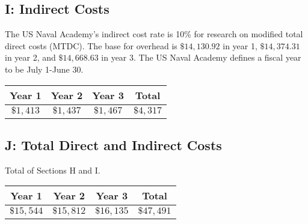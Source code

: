 \documentclass[11pt]{article}
\begin{document}
\subsection*{I: Indirect Costs}
The US Naval Academy's indirect cost rate is
10\% for research on modified total direct costs (MTDC).
The base for overhead is $\$14,130.92$ in year 1, $\$14,374.31$ in
year 2, and $\$14,668.63$ in year 3.
The US Naval Academy defines a fiscal year to be July 1-June 30.
\begin{center}
  \begin{tabular}{|c|c|c|c|}
    \hline
    Year 1 & Year 2 & Year 3 & Total \\
    \hline
    $\$1,413$ & $\$1,437$ & $\$1,467$ & $\$4,317$ \\
    \hline
  \end{tabular}
\end{center}


\subsection*{J: Total Direct and Indirect Costs}
Total of Sections H and I.
\begin{center}
  \begin{tabular}{|c|c|c|c|}
    \hline
    Year 1 & Year 2 & Year 3 & Total \\
    \hline
    $\$15,544$ & $\$15,812$ & $\$16,135$ & $\$47,491$ \\
    \hline
  \end{tabular}
\end{center}
\end{document}
